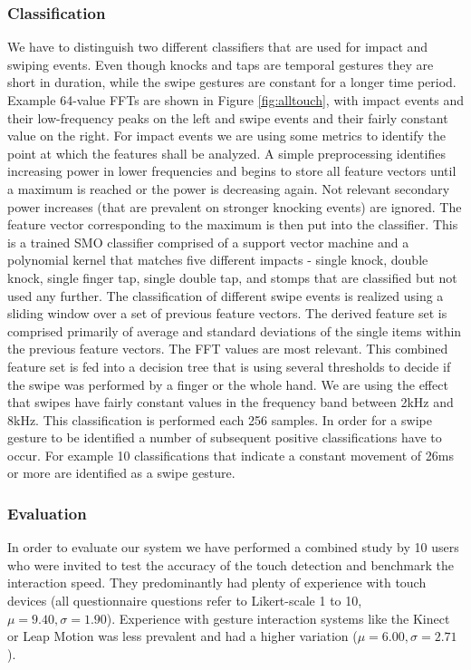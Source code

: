 \subsubsection*{Classification}
We have to distinguish two different classifiers that are used for impact and swiping events. Even though knocks and taps are temporal gestures they are short in duration, while the swipe gestures are constant for a longer time period. Example 64-value FFTs are shown in Figure \ref{fig:alltouch}, with impact events and their low-frequency peaks on the left and swipe events and their fairly constant value on the right. For impact events we are using some metrics to identify the point at which the features shall be analyzed. A simple preprocessing identifies increasing power in lower frequencies and begins to store all feature vectors until a maximum is reached or the power is decreasing again. Not relevant secondary power increases (that are prevalent on stronger knocking events) are ignored. The feature vector corresponding to the maximum is then put into the classifier. This is a trained SMO classifier comprised of a support vector machine and a polynomial kernel that matches five different impacts - single knock, double knock, single finger tap, single double tap, and stomps that are classified but not used any further.
The classification of different swipe events is realized using a sliding window over a set of previous feature vectors. The derived feature set is comprised primarily of average and standard deviations of the single items within the previous feature vectors. The FFT values are most relevant. This combined feature set is fed into a decision tree that is using several thresholds to decide if the swipe was performed by a finger or the whole hand. We are using the effect that swipes have fairly constant values in the frequency band between 2kHz and 8kHz. This classification is performed each 256 samples. In order for a swipe gesture to be identified a number of subsequent positive classifications have to occur. For example 10 classifications that indicate a constant movement of 26ms or more are identified as a swipe gesture.

\subsubsection{Evaluation}
In order to evaluate our system we have performed a combined study by 10 users who were invited to test the accuracy of the touch detection and benchmark the interaction speed. They predominantly had plenty of experience with touch devices (all questionnaire questions refer to Likert-scale 1 to 10, $\mu=9.40, \sigma=1.90$). Experience with gesture interaction systems like the Kinect or Leap Motion was less prevalent and had a higher variation ($\mu=6.00, \sigma=2.71$).
 
